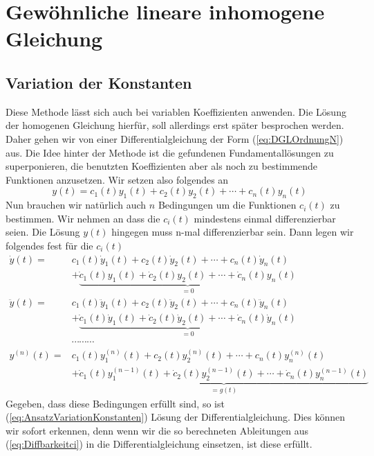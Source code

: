 \chapter{Gewöhnliche lineare inhomogene Gleichung}
\section{Variation der Konstanten}
Diese Methode lässt sich auch bei variablen Koeffizienten anwenden. Die Lösung der homogenen Gleichung hierfür, soll allerdings erst später besprochen werden. Daher gehen wir von einer Differentialgleichung der Form (\ref{eq:DGLOrdnungN})
aus. Die Idee hinter der Methode ist die gefundenen Fundamentallösungen zu
superponieren, die benutzten Koeffizienten aber als noch zu bestimmende
Funktionen anzusetzen. Wir setzen also folgendes an
\begin{equation}
  y(t)=c_1(t)y_1(t)+c_2(t)y_2(t)+\cdots+c_n(t)y_n(t)
  \label{eq:AnsatzVariationKonstanten}
\end{equation}
Nun brauchen wir natürlich auch $n$ Bedingungen um die Funktionen $c_i(t)$ zu
bestimmen. Wir nehmen an dass die $c_i(t)$ mindestens einmal differenzierbar seien.
Die Lösung $y(t)$ hingegen muss n-mal differenzierbar sein. Dann legen wir folgendes fest für die $c_i(t)$
\begin{align}
  \dot{y}(t)=&c_1(t)\dot{y}_1(t)+c_2(t)\dot{y}_2(t)+\cdots+c_n(t)\dot{y}_n(t)\nonumber\\
  &+\underbrace{\dot{c}_1(t)y_1(t)+\dot{c}_2(t)y_2(t)+\cdots+\dot{c}_n(t)y_n(t)}_{=0}\nonumber\\
  \ddot{y}(t)=&c_1(t)\ddot{y}_1(t)+c_2(t)\ddot{y}_2(t)+\cdots+c_n(t)\ddot{y}_n(t)\nonumber\\
  &+\underbrace{\dot{c}_1(t)\dot{y}_1(t)+\dot{c}_2(t)\dot{y}_2(t)+\cdots
               +\dot{c}_n(t)\dot{y}_n(t)}_{=0}\nonumber\\
	       &\cdots\cdots\cdots\nonumber\\
	       y^{(n)}(t)=&c_1(t)y^{(n)}_1(t)+c_2(t)y^{(n)}_2(t)+\cdots+c_n(t)y^{(n)}_n(t)\nonumber\\
  &+\underbrace{\dot{c}_1(t)y^{(n-1)}_1(t)+\dot{c}_2(t)y^{(n-1)}_2(t)+\cdots
  +\dot{c}_n(t)y^{(n-1)}_n(t)}_{=g(t)}\label{eq:Diffbarkeitci}
\end{align}
Gegeben, dass diese Bedingungen erfüllt sind, so ist
(\ref{eq:AnsatzVariationKonstanten}) Lösung der Differentialgleichung. Dies
können wir sofort erkennen, denn wenn wir die so berechneten Ableitungen aus
(\ref{eq:Diffbarkeitci}) in die Differentialgleichung einsetzen, ist diese
erfüllt.

